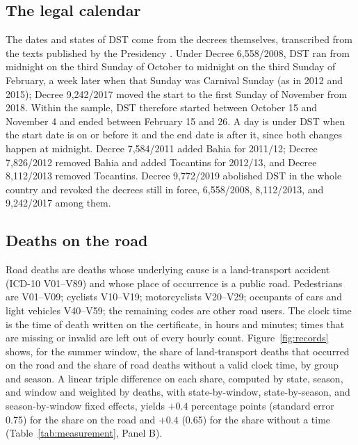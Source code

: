 \subsection{The legal calendar}

The dates and states of DST come from the decrees themselves, transcribed from the texts published by the Presidency \citep{brasil2008decreto, brasil2011decreto, brasil2012decreto, brasil2013decreto, brasil2017decreto, brasil2019decreto}. Under Decree 6,558/2008, DST ran from midnight on the third Sunday of October to midnight on the third Sunday of February, a week later when that Sunday was Carnival Sunday (as in 2012 and 2015); Decree 9,242/2017 moved the start to the first Sunday of November from 2018. Within the sample, DST therefore started between October 15 and November 4 and ended between February 15 and 26. A day is under DST when the start date is on or before it and the end date is after it, since both changes happen at midnight. Decree 7,584/2011 added Bahia for 2011/12; Decree 7,826/2012 removed Bahia and added Tocantins for 2012/13, and Decree 8,112/2013 removed Tocantins. Decree 9,772/2019 abolished DST in the whole country and revoked the decrees still in force, 6,558/2008, 8,112/2013, and 9,242/2017 among them.

\subsection{Deaths on the road}

Road deaths are deaths whose underlying cause is a land-transport accident (ICD-10 V01--V89) and whose place of occurrence is a public road. Pedestrians are V01--V09; cyclists V10--V19; motorcyclists V20--V29; occupants of cars and light vehicles V40--V59; the remaining codes are other road users. The clock time is the time of death written on the certificate, in hours and minutes; times that are missing or invalid are left out of every hourly count. Figure~\ref{fig:records} shows, for the summer window, the share of land-transport deaths that occurred on the road and the share of road deaths without a valid clock time, by group and season. A linear triple difference on each share, computed by state, season, and window and weighted by deaths, with state-by-window, state-by-season, and season-by-window fixed effects, yields $+0.4$ percentage points (standard error 0.75) for the share on the road and $+0.4$ (0.65) for the share without a time (Table~\ref{tab:measurement}, Panel B). %

